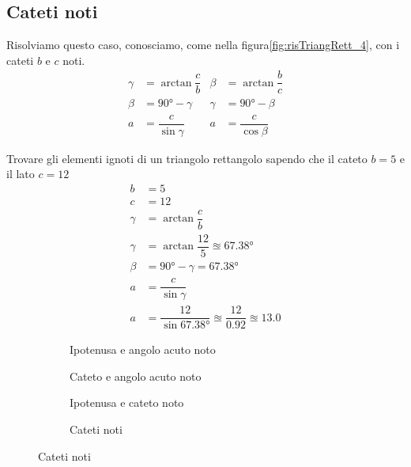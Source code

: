 \subsection{Cateti noti}
Risolviamo questo caso, conosciamo, come nella figura\nobs\vref*{fig:risTriangRett_4}, con i cateti $b$ e $c$ noti.
\begin{align*}
\gamma&=\arctan\dfrac{c}{b}&\beta&=\arctan\dfrac{b}{c}\\
\beta&=\ang{90}-\gamma&\gamma&=\ang{90}-\beta\\
a&=\dfrac{c}{\sin\gamma}&a&=\dfrac{c}{\cos\beta}
\end{align*}
\begin{esempio}
Trovare gli elementi ignoti di un triangolo rettangolo sapendo che  il cateto $b=5$ e il lato $c=12$
\begin{align*}
b&=5\\
c&=12\\
\gamma&=\arctan\dfrac{c}{b}\\
\gamma&=\arctan\dfrac{12}{5}\approxeq\ang{67.38}\\
\beta&=\ang{90}-\gamma=\ang{67.38}\\
a&=\dfrac{c}{\sin\gamma}\\
a&=\dfrac{12}{\sin\ang{67.38}}\approxeq\dfrac{12}{\num{0.92}}\approxeq\num{13.0}
\end{align*}
\end{esempio}
\begin{figure}
	\begin{subfigure}[b]{.5\linewidth}
		\centering

	\caption{Ipotenusa e angolo acuto noto}
	\label{fig:risTriangRett_1}
	\end{subfigure}%
	\begin{subfigure}[b]{.5\linewidth}
		\centering
		
		\caption{Cateto e angolo acuto noto}
		\label{fig:risTriangRett_2}
	\end{subfigure}
	\begin{subfigure}[b]{.5\linewidth}
		\centering
	
	\caption{Ipotenusa e cateto noto}
	\label{fig:risTriangRett_3}
	\end{subfigure}%
	\begin{subfigure}[b]{.5\linewidth}
		\centering
		
		\caption{Cateti noti}
		\label{fig:risTriangRett_4}
	\end{subfigure}
	\label{fig:RisoluzioneTriangoliRettangoli}
\end{figure}
